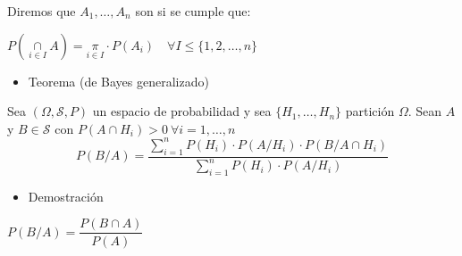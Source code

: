 Diremos que $A_1,\dots,A_n$ son  si se cumple que: 

$P(\underset{i\in I}{\cap}A)=\underset{i\in I}{\pi}\cdot P(A_i)\quad \forall I\le \{1,2,\dots,n\}$
\begin{itemize}[label=\color{red}\textbullet, leftmargin=*]
	\item \color{lightblue}Teorema (de Bayes generalizado)
\end{itemize}
Sea $(\Omega,\mathcal{S}, P)$ un espacio de probabilidad y sea $\{H_1,\dots, H_n\}$ partición $\Omega$. Sean $A$ y $B\in\mathcal{S}$ con $P(A\cap H_i)>0\:\forall i=1,\dots,n$ \[ P(B/A)=\dfrac{\displaystyle\sum_{i=1}^{n}P(H_i)\cdot P(A/H_i)\cdot P(B/A\cap H_i)}{\displaystyle\sum_{i=1}^{n}P(H_i)\cdot P(A/H_i)} \]
\begin{itemize}[label=\color{red}\textbullet, leftmargin=*]
	\item \color{lightblue}Demostración
\end{itemize}
\begin{center}
	$P(B/A)=\dfrac{P(B\cap A)}{P(A)}$\qquad\begin{minipage}[l]{6cm}
\end{minipage}
\end{center}



